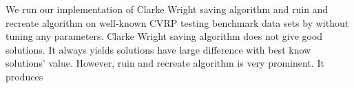 \documentclass[../main.tex]{}
\begin{document}
We run our implementation of Clarke Wright saving algorithm and ruin and recreate algorithm on well-known CVRP testing benchmark data sets by without tuning any parameters. Clarke Wright saving algorithm does not give good solutions. It always yields solutions have large difference with best know solutions' value. However, ruin and recreate algorithm is very prominent. It produces 
\end{document}
